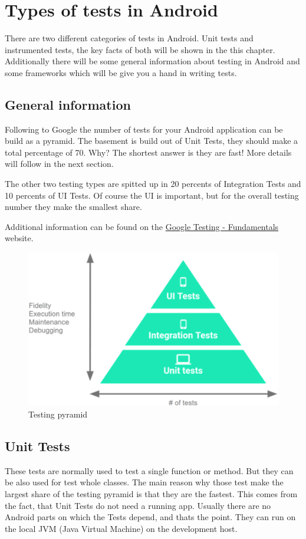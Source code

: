 


	\maketitle
	\tableofcontents
	
	\chapter{Types of tests in Android}
	There are two different categories of tests in Android. Unit tests and instrumented tests, the key facts of both will be shown in the this chapter. Additionally there will be some general information about testing in Android and some frameworks which will be give you a hand in writing tests.
	
	\section{General information}
	Following to Google the number of tests for your Android application can be build as a pyramid. The basement is build out of Unit Tests, they should make a total percentage of 70. Why? The shortest answer is they are fast! More details will follow in the next section.
	
	The other two testing types are spitted up in 20 percents of Integration Tests and 10 percents of UI Tests. Of course the UI is important, but for the overall testing number they make the smallest share.
	
	Additional information can be found on the \href{https://developer.android.com/training/testing/fundamentals
	}{Google Testing - Fundamentals} website.
	
	\begin{figure}[H]
		\centering
		\includegraphics[width=0.5\linewidth]{images/testing_pyramid}
		\caption{Testing pyramid}
		\label{fig:testingpyramid}
	\end{figure}

	\section{Unit Tests}
	These tests are normally used to test a single function or method. But they can be also used for test whole classes. The main reason why those test make the largest share of the testing pyramid is that they are the fastest. This comes from the fact, that Unit Tests do not need a running app. Usually there are no Android parts on which the Tests depend, and thats the point. They can run on the local JVM (Java Virtual Machine) on the development host.
	
